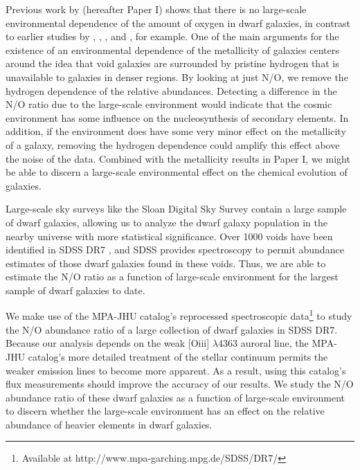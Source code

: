 Previous work by \cite{Douglass17a} (hereafter Paper I) shows that there is no 
large-scale environmental dependence of the amount of oxygen in dwarf galaxies, 
in contrast to earlier studies by \cite{Pustilnik06}, \cite{Cooper08}, 
\cite{Deng11}, and \cite{Filho15}, for example.  One of the main arguments for 
the existence of an environmental dependence of the metallicity of galaxies 
centers around the idea that void galaxies are surrounded by pristine hydrogen 
that is unavailable to galaxies in denser regions.  By looking at just N/O, we 
remove the hydrogen dependence of the relative abundances.  Detecting a 
difference in the N/O ratio due to the large-scale environment would indicate 
that the cosmic environment has some influence on the nucleosynthesis of 
secondary elements.  In addition, if the environment does have some very minor 
effect on the metallicity of a galaxy, removing the hydrogen dependence could 
amplify this effect above the noise of the data.  Combined with the metallicity 
results in Paper I, we might be able to discern a large-scale environmental 
effect on the chemical evolution of galaxies.

Large-scale sky surveys like the Sloan Digital Sky Survey 
\citep[SDSS;][]{Abazajian09} contain a large sample of dwarf galaxies, allowing 
us to analyze the dwarf galaxy population in the nearby universe with more 
statistical significance.  Over 1000 voids have been identified in SDSS DR7 
\citep{Pan12}, and SDSS provides spectroscopy to permit abundance estimates of 
those dwarf galaxies found in these voids.  Thus, we are able to estimate the 
N/O ratio as a function of large-scale environment for the largest sample of 
dwarf galaxies to date.

We make use of the MPA-JHU catalog's reprocessed spectroscopic 
data\footnote{Available at http://www.mpa-garching.mpg.de/SDSS/DR7/} to study 
the N/O abundance ratio of a large collection of dwarf galaxies in SDSS DR7.  
Because our analysis depends on the weak [O{\sc iii}] $\lambda 4363$ auroral 
line, the MPA-JHU catalog's more detailed treatment of the stellar continuum 
permits the weaker emission lines to become more apparent.  As a result, using 
this catalog's flux measurements should improve the accuracy of our results.  We 
study the N/O abundance ratio of these dwarf galaxies as a function of 
large-scale environment to discern whether the large-scale environment has an 
effect on the relative abundance of heavier elements in dwarf galaxies.

